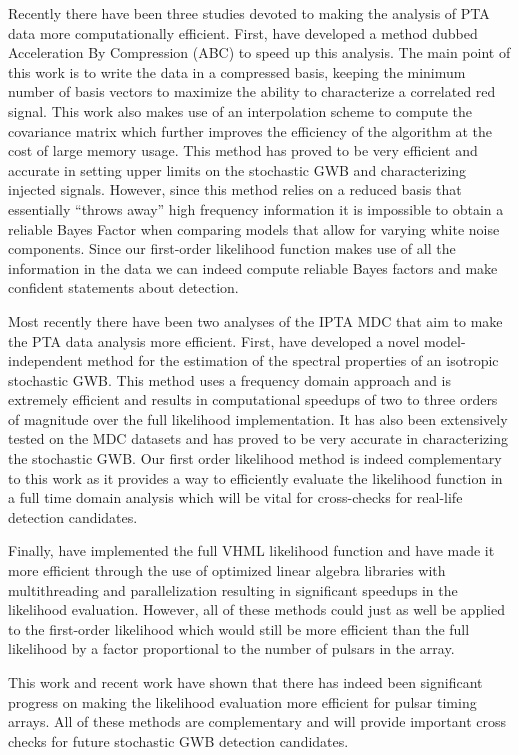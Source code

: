 \documentclass[iop]{emulateapj}
\begin{document}
Recently there have been three studies devoted to making the analysis of PTA data more computationally efficient. First, \citet{vh12} have developed a method dubbed Acceleration By Compression (ABC) to speed up this analysis. The main point of this work is to write the data in a compressed basis, keeping the minimum number of basis vectors to maximize the ability to characterize a correlated red signal. This work also makes use of an interpolation scheme to compute the covariance matrix which further improves the efficiency of the algorithm at the cost of large memory usage. This method has proved to be very efficient and accurate in setting upper limits on the stochastic GWB and characterizing injected signals. However, since this method relies on a reduced basis that essentially ``throws away'' high frequency information it is impossible to obtain a reliable Bayes Factor when comparing models that allow for varying white noise components. Since our first-order likelihood function makes use of all the information in the data we can indeed compute reliable Bayes factors and make confident statements about detection. 

Most recently there have been two analyses of the IPTA MDC that aim to make the PTA data analysis more efficient. First, \citet{Lentati:2012xb} have developed a novel model-independent method for the estimation of the spectral properties of an isotropic stochastic GWB. This method uses a frequency domain approach and is extremely efficient and results in computational speedups of two to three orders of magnitude over the full likelihood implementation. It has also been extensively tested on the MDC datasets and has proved to be very accurate in characterizing the stochastic GWB. Our first order likelihood method is indeed complementary to this work as it provides a way to efficiently evaluate the likelihood function in a full time domain analysis which will be vital for cross-checks for real-life detection candidates.

Finally, \citet{Taylor:2012vx} have implemented the full VHML likelihood function and have made it more efficient through the use of optimized linear algebra libraries with multithreading and parallelization resulting in significant speedups in the likelihood evaluation. However, all of these methods could just as well be applied to the first-order likelihood which would still be more efficient than the full likelihood by a factor proportional to the number of pulsars in the array. 

This work and recent work have shown that there has indeed been significant progress on making the likelihood evaluation more efficient for pulsar timing arrays. All of these methods are complementary and will provide important cross checks for future stochastic GWB detection candidates.
\end{document}
